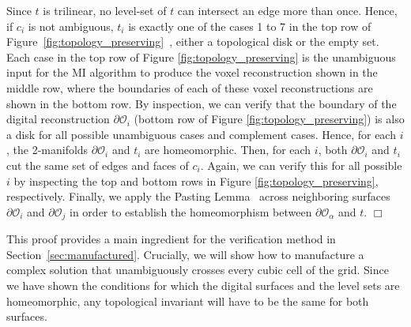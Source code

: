 Since $t$ is trilinear, no level-set of $t$ can intersect an edge more
than once. Hence, if $c_i$ is not ambiguous, $t_i$ is exactly one of
the cases 1 to 7 in the top row of
Figure~\ref{fig:topology_preserving}~\cite{lopes:tvcg:2003},
either a topological disk or the empty set.  
%
%
Each case in the top row of Figure \ref{fig:topology_preserving} is
the unambiguous input for the MI algorithm to produce the voxel
reconstruction shown in the middle row, where the boundaries of each of
these voxel reconstructions are shown in the bottom row.
%
By inspection, we can verify
that the boundary of the digital reconstruction $\partial
\mathcal{O}_i$ (bottom row of Figure \ref{fig:topology_preserving}) is
also a disk for all possible unambiguous cases and complement cases.
Hence, for each $i$, the 2-manifolds $\partial \mathcal{O}_i$ and
$t_i$ are homeomorphic.
%
Then, for each $i$, both $\partial \mathcal{O}_i$ and $t_i$ cut the same
set of edges and faces of $c_i$. Again, we can verify this for all possible $i$
by inspecting the top and bottom rows in Figure \ref{fig:topology_preserving}, respectively.
%
Finally, we apply the Pasting Lemma~\cite{Munkres} across
neighboring surfaces $\partial \mathcal{O}_i$ and $\partial \mathcal{O}_j$ in order to
establish the homeomorphism between $\partial \mathcal{O}_\alpha$
and $t$.
$\Box$

This proof provides a main ingredient for
the verification method in Section~\ref{sec:manufactured}. Crucially, 
we will show how to manufacture a complex solution that
unambiguously crosses every cubic cell of the grid. Since we have
shown the conditions for which the digital surfaces and the level sets
are homeomorphic, any topological invariant will have to be the
same for both surfaces.

